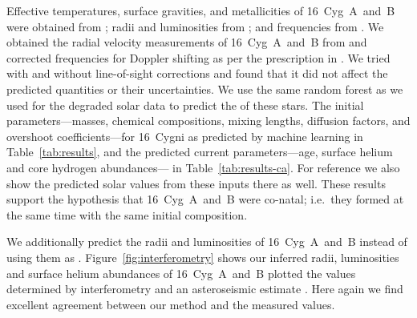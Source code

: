 Effective temperatures, surface gravities, and metallicities of 16~Cyg~A~and~B were obtained from \citet{2009A&A...508L..17R}; radii and luminosities from \citet{2013MNRAS.433.1262W}; and frequencies from \citet{2015MNRAS.446.2959D}. We obtained the radial velocity measurements of 16~Cyg~A~and~B from \citet{2002ApJS..141..503N} and corrected frequencies for Doppler shifting as per the prescription in \citet{2014MNRAS.445L..94D}. We tried with and without line-of-sight corrections and found that it did not affect the predicted quantities or their uncertainties. We use the same random forest as we used for the degraded solar data to predict the  of these stars. The initial parameters---masses, chemical compositions, mixing lengths, diffusion  factors, and overshoot coefficients---for 16~Cygni as predicted by machine learning  in Table~\ref{tab:results}, and the predicted current parameters---age, surface helium and core hydrogen abundances--- in Table~\ref{tab:results-ca}. For reference we also show the predicted solar values from these inputs there as well. These results support the hypothesis that 16~Cyg~A~and~B were co-natal; i.e.\ they formed at the same time with the same initial composition. 

We additionally predict the radii and luminosities of 16~Cyg~A~and~B instead of using them as . Figure~\ref{fig:interferometry} shows our inferred radii, luminosities and surface helium abundances of 16~Cyg~A~and~B plotted  the values determined by interferometry \citep{2013MNRAS.433.1262W} and an asteroseismic estimate \citep{2014ApJ...790..138V}. Here again we find excellent agreement between our method and the measured values. 

